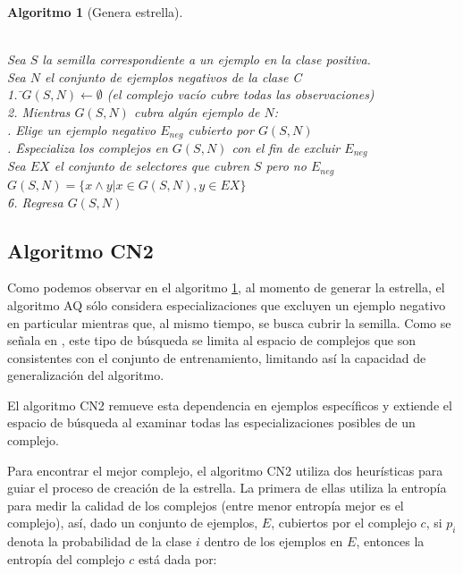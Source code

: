 \documentclass[12pt]{report}
\theoremstyle{break}
\theoremstyle{break}
\newtheorem{algoritmo}{Algoritmo}[chapter]
\begin{document}
\begin{algoritmo}[Genera estrella]
\begin{tabbing}
\\Sea $S$ la semilla correspondiente a un ejemplo en la clase positiva.
\\Sea $N$ el conjunto de ejemplos negativos de la clase C\\
1. \=$G(S,N)\leftarrow \emptyset$ (el complejo vacío cubre todas las observaciones) \\
2. Mientras $G(S,N)$ cubra algún ejemplo de $N$:\\
 . Elige un ejemplo negativo $E_{neg}$ cubierto por $G(S,N)$\\
 . \= Especializa los complejos en $G(S,N)$ con el fin de excluir $E_{neg}$\\
 \> Sea $EX$ el conjunto de selectores que cubren $S$ pero no $E_{neg}$ \\
 \> $G(S,N)=\{x \wedge y \vert x \in G(S,N), y \in EX \}$\\
\=6. Regresa $G(S,N)$
\end{tabbing}
\label{algo:AQ genera estrella}
\end{algoritmo}

\subsection{Algoritmo CN2}
\label{subseccion:algoritmo cn2}
Como podemos observar en el algoritmo \ref{algo:AQ genera estrella}, al momento de generar la estrella, el algoritmo AQ sólo considera especializaciones que excluyen un ejemplo negativo en particular mientras que, al mismo tiempo, se busca cubrir la semilla. Como se señala en \cite{CN2-Clark1989}, este tipo de búsqueda se limita al espacio de complejos que son consistentes con el conjunto de entrenamiento, limitando así la capacidad de generalización del algoritmo.

El algoritmo CN2 remueve esta dependencia en ejemplos específicos y extiende el espacio de búsqueda al examinar todas las especializaciones posibles de un complejo.

Para encontrar el mejor complejo, el algoritmo CN2 utiliza dos heurísticas para guiar el proceso de creación de la estrella. La primera de ellas utiliza la entropía para medir la calidad de los complejos (entre menor entropía mejor es el complejo), así, dado un conjunto de ejemplos, $E$, cubiertos por el complejo $c$, si $p_i$ denota la probabilidad de la clase $i$ dentro de los ejemplos en $E$, entonces la entropía del complejo $c$ está dada por:
\end{document}

